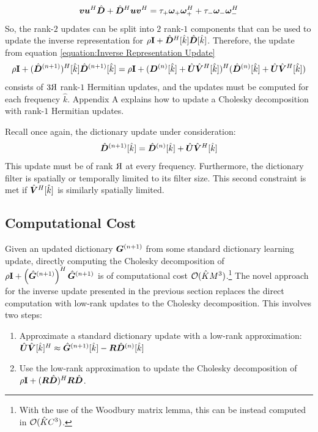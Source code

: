 \begin{equation}
\bm{v}\bm{u}^H\hat{\bm{D}} + \hat{\bm{D}}^H\bm{u}\bm{v}^H = \tau_+\bm{\omega}_+\bm{\omega}_+^H + \tau_-\bm{\omega}_-\bm{\omega}_-^H
\end{equation}
So, the rank-$2$ updates can be split into $2$ rank-$1$ components that can be used to update the inverse representation for $\rho{\bf I} + \hat{\bm{D}}^H[\hat{k}]\hat{\bm{D}}[\hat{k}]$.
Therefore, the update from equation \ref{equation:Inverse Representation Update}
\begin{equation}
\rho{\bf I} + (\hat{\bm{D}}^{(n + 1)})^H[\hat{k}]\hat{\bm{D}}^{(n + 1)}[\hat{k}] = \rho{\bf I} + (\bm{D}^{(n)}[\hat{k}] + \hat{\bm{U}}\hat{\bm{V}}^H[\hat{k}])^H(\hat{\bm{D}}^{(n)}[\hat{k}] + \hat{\bm{U}}\hat{\bm{V}}^H[\hat{k}])
\end{equation}
consists of $3\reflectbox{R}$ rank-$1$ Hermitian updates, and the updates must be computed for each frequency $\hat{k}$. Appendix A explains how to update a Cholesky decomposition with rank-$1$ Hermitian updates.

Recall once again, the dictionary update under consideration:
\begin{equation}
\hat{\bm{D}}^{(n + 1)}[\hat{k}] = \hat{\bm{D}}^{(n)}[\hat{k}] + \hat{\bm{U}}\hat{\bm{V}}^H[\hat{k}]
\end{equation}
%
This update must be of rank $\reflectbox{R}$ at every frequency. Furthermore, the dictionary filter is spatially or temporally limited to its filter size. This second constraint is met if $\hat{\bm{V}}^H[\hat{k}]$ is similarly spatially limited.

\subsection{Computational Cost}
Given an updated dictionary $\bm{G}^{(n + 1)}$ from some standard dictionary learning update, directly computing the Cholesky decomposition of $\rho{\bf I} + \left(\hat{\bm{G}}^{(n + 1)}\right)^H\hat{\bm{G}}^{(n + 1)}$ is of computational cost $\mathcal{O}(\hat{K}M^3)$.\footnote{With the use of the Woodbury matrix lemma, this can be instead computed in $\mathcal{O}(\hat{K}C^3)$.} The novel approach for the inverse update presented in the previous section replaces the direct computation with low-rank updates to the Cholesky decomposition. This involves two steps:
\begin{enumerate}
\item
Approximate a standard dictionary update with a low-rank approximation: $\hat{\bm{U}}\hat{\bm{V}}[\hat{k}]^H \approx \hat{\bm{G}}^{(n + 1)}[\hat{k}] - \bm{R}\hat{\bm{D}}^{(n)}[\hat{k}]$
\item
Use the low-rank approximation to update the Cholesky decomposition of $\rho{\bf I} + (\bm{R}\hat{\bm{D}})^H\bm{R}\hat{\bm{D}}$.
\end{enumerate}

